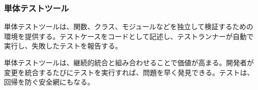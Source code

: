 \subsubsection{単体テストツール}

単体テストツールは、関数、クラス、モジュールなどを独立して検証するための環境を提供する。テストケースをコードとして記述し、テストランナーが自動で実行し、失敗したテストを報告する。

単体テストツールは、継続的統合と組み合わせることで価値が高まる。開発者が変更を統合するたびにテストを実行すれば、問題を早く発見できる。テストは、回帰を防ぐ安全網にもなる。
